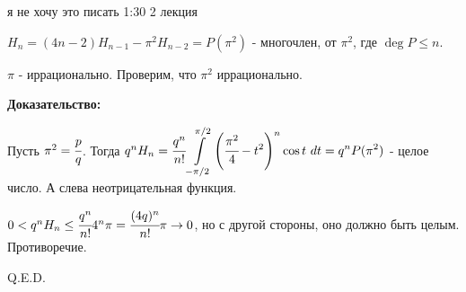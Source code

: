я не хочу это писать 1:30 2 лекция

$H_n = (4n-2)H_{n-1} - \pi^2H_{n-2} = P(\pi^2)$ - многочлен, от $\pi^2$, где $\deg P\leq n$.


$\pi$ - иррационально. Проверим, что $\pi^2$ иррационально. 

\textbf{Доказательство:}

Пусть $\pi^2 = \cfrac{p}{q}$. Тогда $q^nH_n=\cfrac{q^n}{n!}\displaystyle\int\limits_{-\pi/2}^{\pi/2}\left(\cfrac{\pi^2}{4}-t^2\right)^n \cos t \,\, dt = q^n P(\pi^2)$ - целое число. А слева неотрицательная функция.

$0<q^nH_n \leq \cfrac{q^n}{n!}4^n\pi=\cfrac{(4q)^n}{n!}\pi\rightarrow 0$, но с другой стороны, оно должно быть целым. Противоречие.

\hfill Q.E.D.


